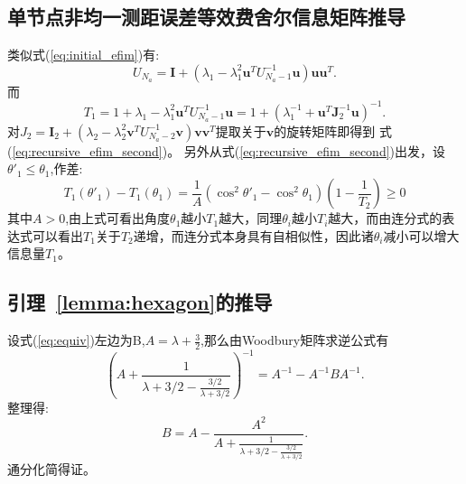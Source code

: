 \subsection{单节点非均一测距误差等效费舍尔信息矩阵推导}\label{B_F_3}
类似式(\ref{eq:initial_efim})有:
\begin{equation}
U_{N_a}=\bm{I}+(\lambda_1-\lambda_1^2 \bm{u}^T U_{N_a-1}^{-1}\bm{u})\bm{u}\bm{u}^T.
\end{equation}
而
\begin{equation}
T_1=1+\lambda_1-\lambda_1^2 \bm{u}^T U_{N_a-1}^{-1}\bm{u}=1+(\lambda_1^{-1}+\bm{u}^T\bm{J}_2^{-1}\bm{u})^{-1}.
\end{equation}
对$J_2=\bm{I}_2+(\lambda_2-\lambda_2^2\bm{v}^T U_{N_a-2}^{-1}\bm{v})\bm{v}\bm{v}^T$提取关于$\bm{v}$的旋转矩阵即得到
式(\ref{eq:recursive_efim_second})。
另外从式(\ref{eq:recursive_efim_second})出发，设$\theta'_1\leq \theta_1$,作差:
\begin{equation}
T_1(\theta'_1)-T_1(\theta_1)=\frac{1}{A}(\cos^2\theta'_1-\cos^2\theta_1)(1-\frac{1}{T_2})\geq 0
\end{equation}
其中$A>0$,由上式可看出角度$\theta_1$越小$T_1$越大，同理$\theta_i$越小$T_i$越大，而由连分式的表达式可以看出$T_1$关于$T_2$递增，而连分式本身具有自相似性，因此诸$\theta_i$减小可以增大信息量$T_1$。

\subsection{引理~\ref{lemma:hexagon}的推导}\label{B_F_4}
  设式(\ref{eq:equiv})左边为B,$A=\lambda+\frac{3}{2}$,那么由Woodbury矩阵求逆公式有
  \begin{equation}
  (A+\frac{1}{\lambda+3/2-\frac{3/2}{\lambda+3/2}})^{-1}=A^{-1}-A^{-1}BA^{-1}.
  \end{equation}
  整理得:
  \begin{equation}
  B=A-\frac{A^2}{A+\frac{1}{\lambda+3/2-\frac{3/2}{\lambda+3/2}}}.
  \end{equation}
  通分化简得证。
